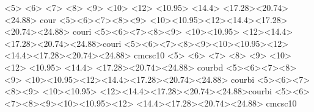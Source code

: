    {  <5> <6> <7> <8> <9> <10> <12> 
      <10.95> 
      <14.4>  
      <17.28><20.74><24.88> cour}{}
    {
      <5><6><7><8><9>
      <10><10.95><12><14.4><17.28><20.74><24.88> couri%
      }{}
    {
      <5><6><7><8><9>
      <10><10.95>
      <12><14.4><17.28><20.74><24.88>couri%
      }{}
    {
      <5><6><7><8><9><10><10.95><12>
      <14.4><17.28><20.74><24.88> cmcsc10
      }{}
   {  <5> <6> <7> <8> <9> <10> <12> 
      <10.95> 
      <14.4>  
      <17.28><20.74><24.88> courbd}{}
    {
      <5><6><7><8><9>
      <10><10.95><12><14.4><17.28><20.74><24.88> courbi%
      }{}
    {
      <5><6><7><8><9>
      <10><10.95>
      <12><14.4><17.28><20.74><24.88>courbi%
      }{}
    {
      <5><6><7><8><9><10><10.95><12>
      <14.4><17.28><20.74><24.88> cmcsc10
      }{}

\renewcommand{\familydefault}{ntr}
\renewcommand{\sfdefault}{ari}
\renewcommand{\ttdefault}{cou}


\endinput
